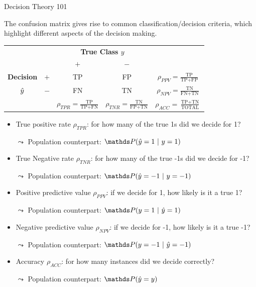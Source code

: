 \begin{vbframe}{Decision Theory 101}
%	
\scriptsize{
%	
	The confusion matrix gives rise to common classification/decision criteria, which highlight different aspects
	of the decision making.
%	
	\begin{center}
		\footnotesize
		\renewcommand{\arraystretch}{1.1}
		\begin{tabular}{cc||cc|c}
			& & \multicolumn{2}{c|}{\bfseries True Class $y$} & \\
			& & $+$ & $-$ & \\ 
			\hline \hline
			\bfseries Decision     & $+$ & TP & FP & $\rho_{PPV} = \frac{\text{TP}}{\text{TP} + \text{FP}}$\\
			$\hat{y}$ & $-$ & FN & TN & $\rho_{NPV} = \frac{\text{TN}}{\text{FN} + \text{TN}}$\\
			\hline
			& & $\rho_{TPR} = \frac{\text{TP}}{\text{TP} + \text{FN}}$ & $\rho_{TNR} = \frac{\text{TN}}{\text{FP} + \text{TN}}$ & $\rho_{ACC} = \frac{\text{TP}+ \text{TN}}{\text{TOTAL}}$
		\end{tabular}
		\renewcommand{\arraystretch}{1}
	\end{center}
%	
	\begin{itemize}
%		
		\item True positive rate $\rho_{TPR}$: for how many of the true 1s did we decide for 1?
%		
		\item [$\leadsto$] Population counterpart: $\P (\yh =1 ~|~ y=1)$
%		
		\item True Negative rate $\rho_{TNR}$: for how many of the true -1s did we decide for -1?
%		
		\item [$\leadsto$] Population counterpart: $\P (\yh = -1 ~|~ y= -1)$
%		
		\item Positive predictive value $\rho_{PPV}$: if we decide for 1, how likely is 
		it a true 1?
%		
		\item [$\leadsto$] Population counterpart: $\P (y = 1 ~|~ \yh = 1)$
%		
		\item Negative predictive value $\rho_{NPV}$: if we decide for -1, how likely is 
		it a true -1?
%		
		\item [$\leadsto$] Population counterpart: $\P (y = -1 ~|~ \yh = -1)$
%
		\item Accuracy $\rho_{ACC}$: for how many instances did we decide correctly?
%		
		\item [$\leadsto$] Population counterpart: $\P (\yh = y  )$
	\end{itemize}
}
\end{vbframe}



